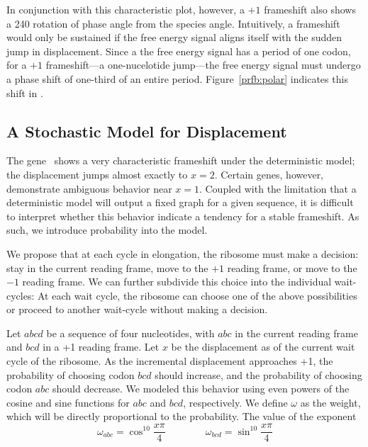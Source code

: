 \documentclass[12pt, draft]{article}
\begin{document}
In conjunction with this characteristic plot, however, a $+1$ frameshift also shows a 240\degree
rotation of phase angle from the species angle.
Intuitively, a frameshift would only be sustained if the free energy signal aligns itself with the sudden jump in displacement.
Since a the free energy signal has a period of one codon, for a $+1$ frameshift---a one-nucelotide jump---the free energy signal
must undergo a phase shift of one-third of an entire period.  Figure~\ref{prfb:polar} indicates this shift in \prfB.

\subsection{A Stochastic Model for Displacement}


The gene \prfB\ shows a very characteristic frameshift under the deterministic model; the displacement jumps almost exactly to $x=2$.
Certain genes, however, demonstrate ambiguous behavior near $x = 1$.
Coupled with the limitation that a deterministic model will output a fixed graph for a given sequence, 
it is difficult to interpret whether this behavior indicate a tendency for a stable frameshift.
As such, we introduce probability into the model.

We propose that at each cycle in elongation, the ribosome must make a decision: stay in the current reading frame, move to the $+1$ reading frame,
or move to the $-1$ reading frame.  We can further subdivide this choice into the individual wait-cycles: 
At each wait cycle, the ribosome can choose one of the above possibilities or proceed to another wait-cycle without making a decision.

Let $abcd$ be a sequence of four nucleotides, with $abc$ in the current reading frame and $bcd$ in a +1 reading frame.  Let $x$ be the displacement as of the current wait cycle of the ribosome.  As the incremental displacement approaches +1, the probability of choosing codon $bcd$ should increase, and the probability of choosing codon $abc$ should decrease.  We modeled this behavior using even powers of the cosine and sine functions for $abc$ and $bcd$, respectively.  We define $\omega$ as the weight, which will be directly proportional to the probability.  The value of the exponent 
$$\omega_{abc} = \cos^{10}{\frac{x\pi}{4}} \qquad \qquad \omega_{bcd} = \sin^{10}{\frac{x\pi}{4}}$$
\end{document}
